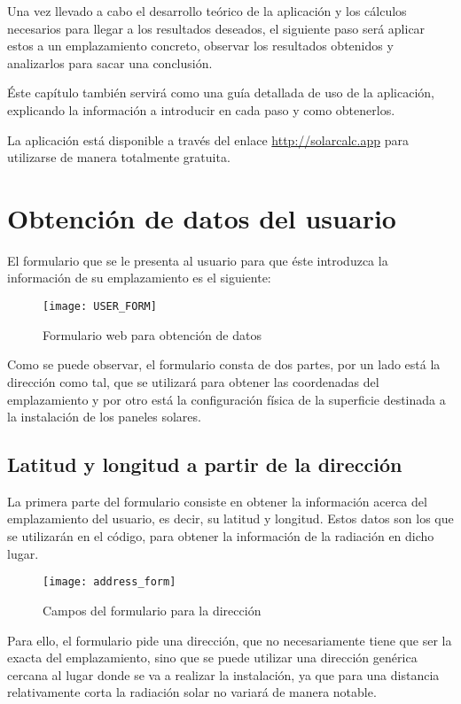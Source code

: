 Una vez llevado a cabo el desarrollo teórico de la aplicación y los cálculos necesarios para llegar a los resultados deseados, el siguiente paso será aplicar estos a un emplazamiento concreto, observar los resultados obtenidos y analizarlos para sacar una conclusión.

Éste capítulo también servirá como una guía detallada de uso de la aplicación, explicando la información a introducir en cada paso y como obtenerlos.

La aplicación está disponible a través del enlace \url{http://solarcalc.app} para utilizarse de manera totalmente gratuita.

\section{Obtención de datos del usuario}

El formulario que se le presenta al usuario para que éste introduzca la información de su emplazamiento es el siguiente:
\begin{figure}[ht]
\texttt{[image: USER\_FORM]}
\centering
\caption{Formulario web para obtención de datos}
\label{fig:user_form}
\end{figure}

Como se puede observar, el formulario consta de dos partes, por un lado está la dirección como tal, que se utilizará para obtener las coordenadas del emplazamiento y por otro está la configuración física de la superficie destinada a la instalación de los paneles solares.

\subsection{Latitud y longitud a partir de la dirección}

La primera parte del formulario consiste en obtener la información acerca del emplazamiento del usuario, es decir, su latitud y longitud. Estos datos son los que se utilizarán en el código, para obtener la información de la radiación en dicho lugar.

\begin{figure}[ht]
\texttt{[image: address\_form]}
\centering
\caption{Campos del formulario para la dirección}
\label{fig:address_form}
\end{figure}

Para ello, el formulario pide una dirección, que no necesariamente tiene que ser la exacta del emplazamiento, sino que se puede utilizar una dirección genérica cercana al lugar donde se va a realizar la instalación, ya que para una distancia relativamente corta la radiación solar no variará de manera notable.

